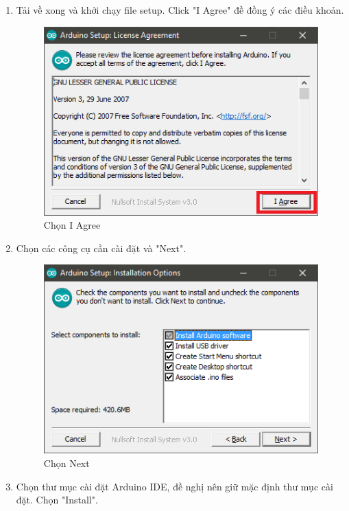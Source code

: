 \begin{enumerate}
\begin{center}
\begin{figure}[htp]
\end{figure}
\end{center}
\item Tải về xong và khởi chạy file setup. Click "I Agree" đề đồng ý các điều khoản.
\begin{center}
\begin{figure}[htp]
\begin{center}
\includegraphics[scale=0.7]{image4/arduino3.png}
\end{center}
\caption{Chọn I Agree}
\end{figure}
\end{center}
\newpage
\item Chọn các công cụ cần cài đặt và "Next".
\begin{center}
\begin{figure}[htp]
\begin{center}
\includegraphics[scale=0.7]{image4/arduino4.PNG}
\end{center}
\caption{Chọn Next}
\end{figure}
\end{center}
\item  Chọn thư mục cài đặt Arduino IDE, đề nghị nên giữ mặc định thư mục cài đặt. Chọn "Install".

\end{enumerate}
